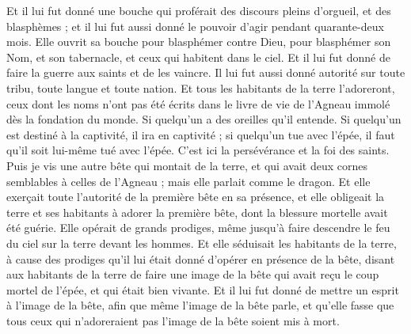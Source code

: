 \begin{multicols}{2}
Et il lui fut donné une bouche qui proférait des discours pleins d'orgueil, et des blasphèmes ; et il lui fut aussi donné le pouvoir d'agir pendant quarante-deux mois.
Elle ouvrit sa bouche pour blasphémer contre Dieu, pour blasphémer son Nom, et son tabernacle, et ceux qui habitent dans le ciel.
Et il lui fut donné de faire la guerre aux saints et de les vaincre. Il lui fut aussi donné autorité sur toute tribu, toute langue et toute nation.
Et tous les habitants de la terre l'adoreront, ceux dont les noms n'ont pas été écrits dans le livre de vie de l'Agneau immolé dès la fondation du monde.
Si quelqu'un a des oreilles qu'il entende.
Si quelqu'un est destiné à la captivité, il ira en captivité ; si quelqu'un tue avec l'épée, il faut qu'il soit lui-même tué avec l'épée. C'est ici la persévérance et la foi des saints.
Puis je vis une autre bête qui montait de la terre, et qui avait deux cornes semblables à celles de l'Agneau ; mais elle parlait comme le dragon.
Et elle exerçait toute l'autorité de la première bête en sa présence, et elle obligeait la terre et ses habitants à adorer la première bête, dont la blessure mortelle avait été guérie.
Elle opérait de grands prodiges, même jusqu'à faire descendre le feu du ciel sur la terre devant les hommes.
Et elle séduisait les habitants de la terre, à cause des prodiges qu'il lui était donné d'opérer en présence de la bête, disant aux habitants de la terre de faire une image de la bête qui avait reçu le coup mortel de l'épée, et qui était bien vivante.
Et il lui fut donné de mettre un esprit à l'image de la bête, afin que même l'image de la bête parle, et qu'elle fasse que tous ceux qui n'adoreraient pas l'image de la bête soient mis à mort.

\end{multicols}
